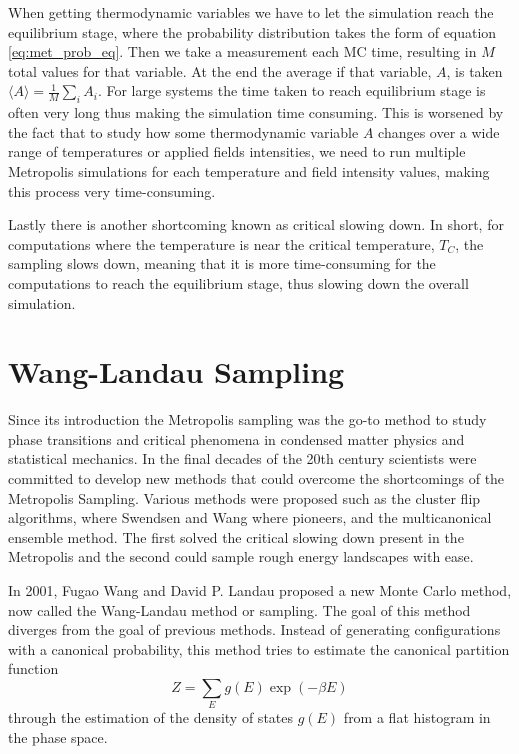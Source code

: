 When getting thermodynamic variables we have to let the simulation reach the equilibrium stage, where the probability distribution takes the form of equation \ref{eq:met_prob_eq}. Then we take a measurement each MC time, resulting in $M$ total values for that variable. At the end the average if that variable, $A$, is taken $\langle A \rangle = \frac{1}{M} \sum_i A_i$. 
For large systems the time taken to reach equilibrium stage is often very long thus making the simulation time consuming. 
This is worsened by the fact that to study how some thermodynamic variable $A$ changes over a wide range of temperatures or applied fields intensities, we need to run multiple Metropolis simulations for each temperature and field intensity values, making this process very time-consuming.

Lastly there is another shortcoming known as critical slowing down. In short, for computations where the temperature is near the critical temperature, $T_C$, the sampling slows down, meaning that it is more time-consuming for the computations to reach the equilibrium stage, thus slowing down the overall simulation.

\section{Wang-Landau Sampling}

Since its introduction the Metropolis sampling was the go-to method to study phase transitions and critical phenomena in condensed matter physics and statistical mechanics. In the final decades of the 20th century scientists were committed to develop new methods that could overcome the shortcomings of the Metropolis Sampling. Various methods were proposed such as the cluster flip algorithms, where Swendsen and Wang where pioneers, and the multicanonical ensemble method. The first solved the critical slowing down present in the Metropolis and the second could sample rough energy landscapes with ease. 

In 2001, Fugao Wang and David P. Landau proposed a new Monte Carlo method, now called the Wang-Landau method or sampling. The goal of this method diverges from the goal of previous methods. Instead of generating configurations with a canonical probability, this method tries to estimate the canonical partition function
\begin{equation}
	Z = \sum_E g(E) \exp(-\beta E)
\end{equation}
through the estimation of the density of states $g(E)$ from a flat histogram in the phase space.

